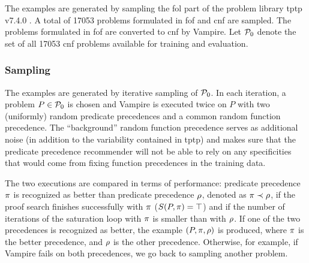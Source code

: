 
The examples are generated by sampling the \gls{fol} part of the problem library \gls{tptp} v7.4.0 \cite{10.1007/978-3-030-29436-6_29}.
A total of \num{17053} problems formulated in \gls{fof} and \gls{cnf} are sampled.
The problems formulated in \gls{fof} are converted to \gls{cnf} by Vampire.
Let $\operatorname{\mathcal{P}_{0}}$ denote the set of all \num{17053} \gls{cnf} problems available for training and evaluation.

\subsubsection{Sampling}

The examples are generated by iterative sampling of $\operatorname{\mathcal{P}_{0}}$.
In each iteration, a problem $P \in \operatorname{\mathcal{P}_{0}}$ is chosen and Vampire is executed twice on $P$
with two (uniformly) random predicate precedences and a common random function precedence.
The ``background'' random function precedence serves as additional noise (in addition to the variability 
contained in \gls{tptp}) and makes sure that the predicate precedence recommender
will not be able to rely on any specificities that would come from fixing function precedences in the training data.

The two executions are compared in terms of performance:
predicate precedence $\pi$ is recognized as better than predicate precedence $\rho$,
denoted as $\pi \prec \rho$,
if the proof search finishes successfully with $\pi$ ($S(P, \pi) = \top$)
and if the number of iterations of the saturation loop with $\pi$ is smaller than with $\rho$.
If one of the two precedences is recognized as better,
the example $(P, \pi, \rho)$ is produced,
where $\pi$ is the better precedence,
and $\rho$ is the other precedence.
Otherwise, for example, if Vampire fails on both precedences, we go back to sampling another problem.

